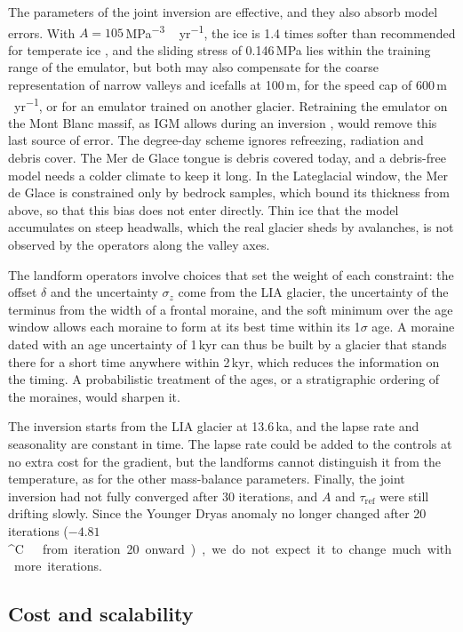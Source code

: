 \documentclass[tc, manuscript]{copernicus}
\newcommand{\degC}{\unit{^{\circ}C}}
\newcommand{\myr}{\unit{m\,yr^{-1}}}
\newcommand{\Aunit}{\unit{MPa^{-3}\,yr^{-1}}}
\newcommand{\taur}{\tau_\mathrm{ref}}
\begin{document}
The parameters of the joint inversion are effective, and they also absorb model errors. With $A=105$\,\Aunit, the ice is 1.4 times softer than recommended for temperate ice \citep{cuffey2010}, and the sliding stress of 0.146\,MPa lies within the training range of the emulator, but both may also compensate for the coarse representation of narrow valleys and icefalls at 100\,m, for the speed cap of 600\,\myr, or for an emulator trained on another glacier. Retraining the emulator on the Mont Blanc massif, as IGM allows during an inversion \citep{jouvet2023inv}, would remove this last source of error. The degree-day scheme ignores refreezing, radiation and debris cover. The Mer de Glace tongue is debris covered today, and a debris-free model needs a colder climate to keep it long. In the Lateglacial window, the Mer de Glace is constrained only by bedrock samples, which bound its thickness from above, so that this bias does not enter directly. Thin ice that the model accumulates on steep headwalls, which the real glacier sheds by avalanches, is not observed by the operators along the valley axes.

The landform operators involve choices that set the weight of each constraint: the offset $\delta$ and the uncertainty $\sigma_z$ come from the LIA glacier, the uncertainty of the terminus from the width of a frontal moraine, and the soft minimum over the age window allows each moraine to form at its best time within its 1$\sigma$ age. A moraine dated with an age uncertainty of 1\,kyr can thus be built by a glacier that stands there for a short time anywhere within 2\,kyr, which reduces the information on the timing. A probabilistic treatment of the ages, or a stratigraphic ordering of the moraines, would sharpen it.

The inversion starts from the LIA glacier at 13.6\,ka, and the lapse rate and seasonality are constant in time. The lapse rate could be added to the controls at no extra cost for the gradient, but the landforms cannot distinguish it from the temperature, as for the other mass-balance parameters. Finally, the joint inversion had not fully converged after 30 iterations, and $A$ and $\taur$ were still drifting slowly. Since the Younger Dryas anomaly no longer changed after 20 iterations ($-4.81$\,\degC\ from iteration 20 onward), we do not expect it to change much with more iterations.

\subsection{Cost and scalability}
\label{sec:cost}
\end{document}
